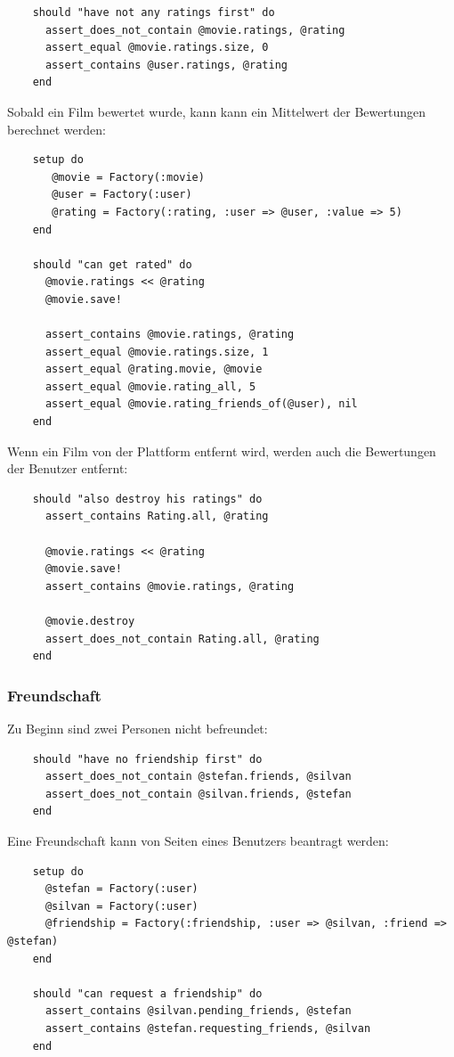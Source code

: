 \begin{verbatim}
    should "have not any ratings first" do
      assert_does_not_contain @movie.ratings, @rating
      assert_equal @movie.ratings.size, 0
      assert_contains @user.ratings, @rating
    end
\end{verbatim}

Sobald ein Film bewertet wurde, kann kann ein Mittelwert der Bewertungen
berechnet werden:

\begin{verbatim}
    setup do
       @movie = Factory(:movie)
       @user = Factory(:user)
       @rating = Factory(:rating, :user => @user, :value => 5)
    end
    
    should "can get rated" do
      @movie.ratings << @rating
      @movie.save!
      
      assert_contains @movie.ratings, @rating
      assert_equal @movie.ratings.size, 1
      assert_equal @rating.movie, @movie
      assert_equal @movie.rating_all, 5
      assert_equal @movie.rating_friends_of(@user), nil
    end
\end{verbatim}

Wenn ein Film von der Plattform entfernt wird, werden auch die Bewertungen
der Benutzer entfernt:

\begin{verbatim}
    should "also destroy his ratings" do
      assert_contains Rating.all, @rating
      
      @movie.ratings << @rating
      @movie.save!
      assert_contains @movie.ratings, @rating
      
      @movie.destroy
      assert_does_not_contain Rating.all, @rating
    end
\end{verbatim}

\subsubsection{Freundschaft}
Zu Beginn sind zwei Personen nicht befreundet:

\begin{verbatim}
    should "have no friendship first" do
      assert_does_not_contain @stefan.friends, @silvan
      assert_does_not_contain @silvan.friends, @stefan
    end
\end{verbatim}

Eine Freundschaft kann von Seiten eines Benutzers beantragt werden:

\begin{verbatim}
    setup do
      @stefan = Factory(:user)
      @silvan = Factory(:user)
      @friendship = Factory(:friendship, :user => @silvan, :friend => @stefan)
    end
    
    should "can request a friendship" do
      assert_contains @silvan.pending_friends, @stefan
      assert_contains @stefan.requesting_friends, @silvan
    end
\end{verbatim}

